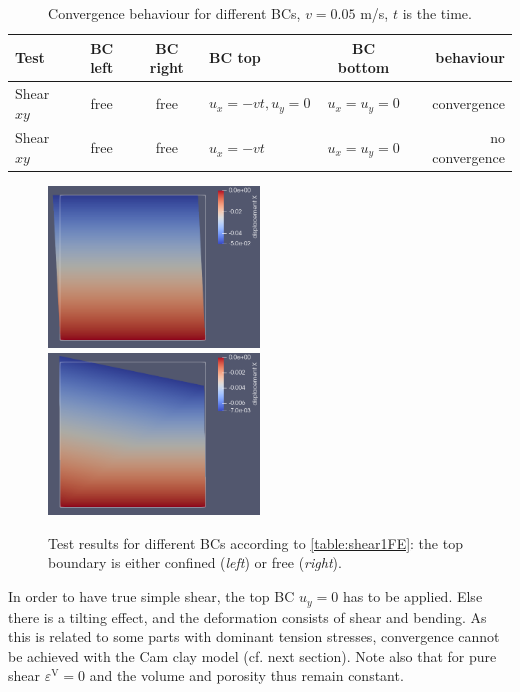 \documentclass[paper=a4, twoside, pagesize]{scrartcl}
\begin{document}
\begin{table}[h!]
  \begin{tabular}{l|c|c|l|c|r}
     Test                    & BC left   & BC right      & BC top               & BC bottom   & behaviour\\
     \hline
     Shear $xy$         & free      & free          & $u_x=-v t, u_y=0$  & $u_x=u_y=0$ & convergence\\
     Shear $xy$         & free      & free          & $u_x=-v t$         & $u_x=u_y=0$ & no convergence\\
     \hline 
  \end{tabular}
  \caption{Convergence behaviour for different BCs, $v=0.05$ m/s, $t$ is the time.}\label{table:shear1FE}
\end{table}

\begin{figure}[h]
  \includegraphics[width=0.5\textwidth]{img/SemiExplicitModifiedCamClay_OpenGeoSys2023/SimpleShearCamClay_uyTop=0.png}
  \includegraphics[width=0.5\textwidth]{img/SemiExplicitModifiedCamClay_OpenGeoSys2023/SimpleShearCamClay_freeTop.png}
  \caption{Test results for different BCs according to \autoref{table:shear1FE}: the top boundary is either confined (\textsl{left}) or free (\textsl{right}). }\label{fig:shear1FE}
\end{figure}

In order to have true simple shear, the top BC $u_y=0$ has to be applied. Else there is a tilting effect, and the deformation consists of shear and bending. As this is related to some parts with dominant tension stresses, convergence cannot be achieved with the Cam clay model (cf. next section). Note also that for pure shear $\varepsilon^\text{V}=0$ and the volume and porosity thus remain constant. %
\end{document}
